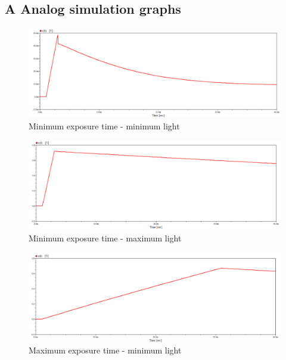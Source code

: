 \subsection*{A Analog simulation graphs}
\label{sec:analogSimulationGraphs}

\begin{figure}[H]
    \centering
    \includegraphics[width=\textwidth]{graphs/minExp_minLight.png}
    \caption{Minimum exposure time - minimum light}
    \label{fig:min-min}
\end{figure}

\begin{figure}[H]
    \centering
    \includegraphics[width=\textwidth]{graphs/minExp_maxLight.png}
    \caption{Minimum exposure time - maximum light}
    \label{fig:min-max}
\end{figure}

\begin{figure}[H]
    \centering
    \includegraphics[width=\textwidth]{graphs/maxExp_minLight.png}
    \caption{Maximum exposure time - minimum light}
    \label{fig:max-min}
\end{figure}


